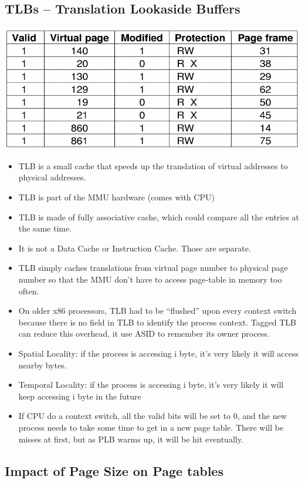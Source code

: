 \documentclass[12pt]{article}
\begin{document}
\subsection{TLBs – Translation Lookaside Buffers}
\includegraphics[width=\textwidth]{TLB.png}
\begin{itemize}
    \item TLB is a small cache that speeds up the translation of virtual addresses to physical addresses.
    \item TLB is part of the MMU hardware (comes with CPU)
    \item TLB is made of fully associative cache, which could compare all the entries at the same time.
    \item It is not a Data Cache or Instruction Cache. Those are separate.
    \item TLB simply caches translations from virtual page number to physical page number so that the MMU don’t have to access page-table in memory too often.
    \item On older x86 processors, TLB had to be “flushed” upon every context switch because there is no field in TLB to identify the process context. Tagged TLB can reduce this overhead, it use ASID to remember its owner process.
    \item Spatial Locality: if the process is accessing i byte, it's very likely it will access nearby bytes.
    \item Temporal Locality: if the process is accessing i byte, it's very likely it will keep accessing i byte in the future
    \item If CPU do a context switch, all the valid bits will be set to 0, and the new process needs to take some time to get in a new page table. There will be misses at first, but as PLB warms up, it will be hit eventually.
\end{itemize}
\subsection{Impact of Page Size on Page tables}
\end{document}

